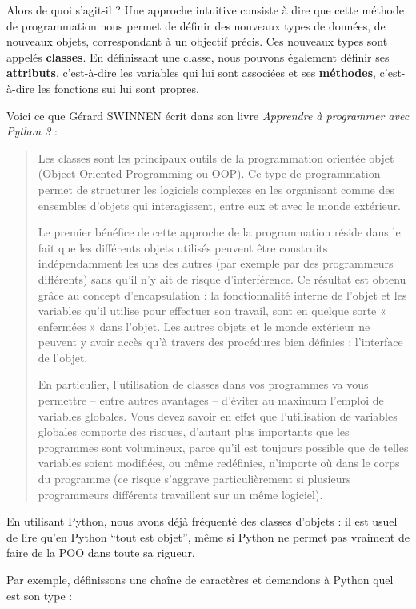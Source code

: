 \documentclass[
  a4paper,
  DIV=11,
  numbers=noendperiod]{scrartcl}
\begin{document}
Alors de quoi s'agit-il ? Une approche intuitive consiste à dire que
cette méthode de programmation nous permet de définir des nouveaux types
de données, de nouveaux objets, correspondant à un objectif précis. Ces
nouveaux types sont appelés \textbf{classes}. En définissant une classe,
nous pouvons également définir ses \textbf{attributs}, c'est-à-dire les
variables qui lui sont associées et ses \textbf{méthodes}, c'est-à-dire
les fonctions sui lui sont propres.

Voici ce que Gérard SWINNEN écrit dans son livre \emph{Apprendre à
programmer avec Python 3} :

\begin{quote}
Les classes sont les principaux outils de la programmation orientée
objet (Object Oriented Programming ou OOP). Ce type de programmation
permet de structurer les logiciels complexes en les organisant comme des
ensembles d'objets qui interagissent, entre eux et avec le monde
extérieur.

Le premier bénéfice de cette approche de la programmation réside dans le
fait que les différents objets utilisés peuvent être construits
indépendamment les uns des autres (par exemple par des programmeurs
différents) sans qu'il n'y ait de risque d'interférence. Ce résultat est
obtenu grâce au concept d'encapsulation : la fonctionnalité interne de
l'objet et les variables qu'il utilise pour effectuer son travail, sont
en quelque sorte « enfermées » dans l'objet. Les autres objets et le
monde extérieur ne peuvent y avoir accès qu'à travers des procédures
bien définies : l'interface de l'objet.

En particulier, l'utilisation de classes dans vos programmes va vous
permettre -- entre autres avantages -- d'éviter au maximum l'emploi de
variables globales. Vous devez savoir en effet que l'utilisation de
variables globales comporte des risques, d'autant plus importants que
les programmes sont volumineux, parce qu'il est toujours possible que de
telles variables soient modifiées, ou même redéfinies, n'importe où dans
le corps du programme (ce risque s'aggrave particulièrement si plusieurs
programmeurs différents travaillent sur un même logiciel).
\end{quote}

En utilisant Python, nous avons déjà fréquenté des classes d'objets : il
est usuel de lire qu'en Python ``tout est objet'', même si Python ne
permet pas vraiment de faire de la POO dans toute sa rigueur.

Par exemple, définissons une chaîne de caractères et demandons à Python
quel est son type :
\end{document}

